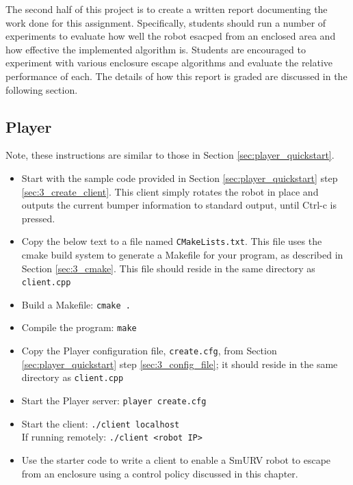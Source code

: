 The second half of this project is to create a written report documenting the work done for this assignment. Specifically, students should run a number of experiments to evaluate how well the robot esacped from an enclosed area and how effective the implemented algorithm is. Students are encouraged to experiment with various enclosure escape algorithms and evaluate the relative performance of each. The details of how this report is graded are discussed in the following section.

\subsection{Player}

Note, these instructions are similar to those in Section \ref{sec:player_quickstart}.

\begin{itemize}

\item Start with the sample code provided in Section \ref{sec:player_quickstart} step \ref{sec:3_create_client}. This client simply rotates the robot in place and outputs the current bumper information to standard output, until Ctrl-c is pressed. 

\item Copy the below text to a file named \texttt{CMakeLists.txt}. This file uses the cmake build system to generate a Makefile for your program, as described in Section \ref{sec:3_cmake}. This file should reside in the same directory as \texttt{client.cpp}

\item Build a Makefile: \texttt{cmake .}

\item Compile the program: \texttt{make}

\item Copy the Player configuration file, \texttt{create.cfg}, from Section \ref{sec:player_quickstart} step \ref{sec:3_config_file}; it should reside in the same directory as \texttt{client.cpp}

\item Start the Player server: \texttt{player create.cfg}

\item Start the client: \texttt{./client localhost}\\
If running remotely: \texttt{./client <robot IP>}

\item Use the starter code to write a client to enable a SmURV robot to escape from an enclosure using a control policy discussed in this chapter.

\end{itemize}

